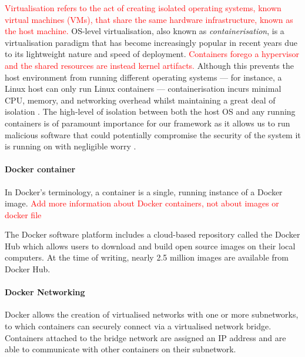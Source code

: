 \documentclass[sigconf,anonymous]{acmart}\usepackage[]{graphicx}\usepackage[]{color}
\begin{document}
\textcolor{red}{Virtualisation refers to the act of creating isolated operating systems, known virtual machines (VMs), that share the same hardware infrastructure, known as the host machine.} %
OS-level virtualisation, also known as \emph{containerisation}, is a virtualisation paradigm that has become increasingly popular in recent years due to its lightweight nature and speed of deployment. \textcolor{red}{Containers forego a hypervisor and the shared resources are instead kernel artifacts.} Although this prevents the host environment from running different operating systems --- for instance, a Linux host can only run Linux containers --- containerisation incurs minimal CPU, memory, and networking overhead whilst maintaining a great deal of isolation \cite{kolyshkin2006virtualization}. The high-level of isolation between both the host OS and any running containers is of paramount importance for our framework as it allows us to run malicious software that could potentially compromise the security of the system it is running on with negligible worry \cite{reshetova2014security}.



\paragraph*{Docker container}

In Docker's terminology, a container is a single, running instance of a Docker image. 
\textcolor{red}{Add more information about Docker containers, not about images or docker file}

The Docker software platform includes a cloud-based repository called the Docker Hub \cite{dockerhub} which allows users to download and build open source images on their local computers. At the time of writing, nearly 2.5 million images are available from Docker Hub. 

\paragraph*{Docker Networking} 


Docker allows the creation of virtualised networks with one or more subnetworks, to which containers can securely connect via a virtualised network bridge. Containers attached to the bridge network are assigned an IP address and are able to communicate with other containers on their subnetwork.
\end{document}
